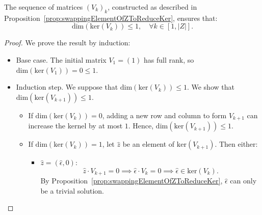 \documentclass[11pt]{llncs}
\begin{document}
\begin{proposition}\label{prop:upperBoundOnRightKernel}
    The sequence of matrices \( (V_k)_k \), constructed as described in Proposition~\ref{prop:swappingElementOfZToReduceKer}, ensures that:    
    \[
    \text{dim}\left(\text{ker}\left(V_k\right)\right) \leq 1, \quad \forall k \in [1, |Z|].
    \]
\end{proposition}
\begin{proof}
    We prove the result by induction:
    \begin{itemize}
        \item Base case. The initial matrix $V_1 = (1)$ has full rank, so $\text{dim}( \text{ker}(V_1)) = 0 \leq 1$.
        \item Induction step. We suppose that $\text{dim}( \text{ker}(V_k))\le 1$. We show that $\text{dim}( \text{ker}(V_{k+1}))\le 1$.
        \begin{itemize}
            \item If $\text{dim}( \text{ker}(V_k))= 0$, adding a new row and column to form $V_{k+1}$ can increase the kernel by at most $1$. Hence, $\text{dim}( \text{ker}(V_{k+1}))\le 1$.
            \item %
            If $\text{dim}( \text{ker}(V_k))= 1$, let $\hat{z}$ be an element of $\text{ker}\left(V_{k+1}\right)$. 
            Then either:
            \begin{itemize}
            	\item  \( \hat{z} = (\hat{\epsilon}, 0) \):  
\[
\hat{z} \cdot V_{k+1} = 0 \implies \hat{\epsilon} \cdot V_k = 0 \implies \hat{\epsilon} \in \text{ker}(V_k).
\]
By Proposition~\ref{prop:swappingElementOfZToReduceKer}, \( \hat{\epsilon} \) can only be a trivial solution.


\end{itemize}
\end{itemize}
\end{itemize}
\end{proof}
\end{document}
